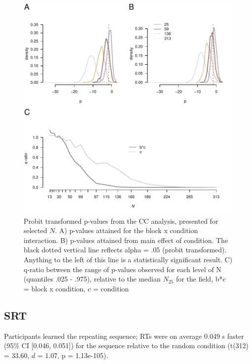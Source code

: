 \documentclass{article}
\begin{document}
\begin{figure}

{\centering \includegraphics[width=0.4\linewidth]{../images/IMMCC_ps} 

}

\caption{Probit transformed p-values from the CC analysis, presented for selected $N$. A) p-values attained for the block x condition interaction. B) p-values attained from main effect of condition. The black dotted vertical line reflects alpha = .05 (probit transformed). Anything to the left of this line is a statistically significant result. C) q-ratio between the range of p-values observed for each level of N (quantiles .025 - .975), relative to the median $N_{25}$ for the field, b*c = block x condition, c = condition}\label{fig:CCps}
\end{figure}

\hypertarget{srt}{%
\subsection{SRT}\label{srt}}

Participants learned the repeating sequence; RTs were on average 0.049 s faster (95\% CI {[}0.046, 0.051{]}) for the sequence relative to the random condition (t(312) = 33.60, \(d\) = 1.07, p = 1.13e-105).
\end{document}
